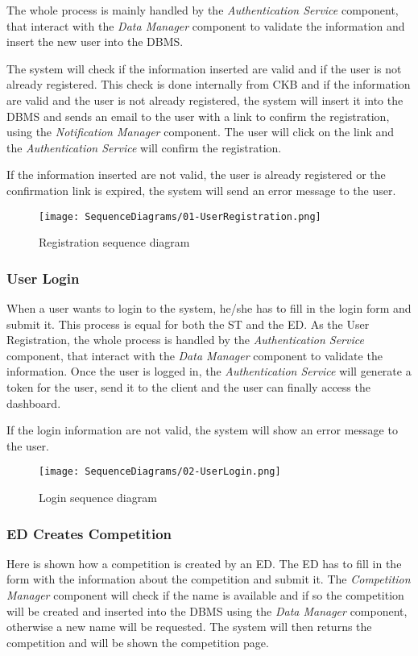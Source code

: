 The whole process is mainly handled by the \textit{Authentication Service} component, that interact with the \textit{Data Manager} component to validate the information and insert the new user into the DBMS.

The system will check if the information inserted are valid and if the user is not already registered. This check is done internally from CKB and if the information are valid and the user is not already registered, the system will insert it into the DBMS and sends an email to the user with a link to confirm the registration, using the \textit{Notification Manager} component. The user will click on the link and the \textit{Authentication Service} will confirm the registration.

If the information inserted are not valid, the user is already registered or the confirmation link is expired, the system will send an error message to the user.

\begin{figure}[H]
  \centering
  \texttt{[image: SequenceDiagrams/01-UserRegistration.png]}
  \caption{Registration sequence diagram}
  \label{fig:registratio_diagramn}
\end{figure}

\subsubsection*{User Login}
\label{ss:login_diagram}%
When a user wants to login to the system, he/she has to fill in the login form and submit it. This process is equal for both the ST and the ED. As the User Registration, the whole process is handled by the \textit{Authentication Service} component, that interact with the \textit{Data Manager} component to validate the information. Once the user is logged in, the \textit{Authentication Service} will generate a token for the user, send it to the client and the user can finally access the dashboard.

If the login information are not valid, the system will show an error message to the user.

\begin{figure}[H]
  \centering
  \texttt{[image: SequenceDiagrams/02-UserLogin.png]}
  \caption{Login sequence diagram}
  \label{fig:login_diagramn}
\end{figure}

\subsubsection*{ED Creates Competition}
\label{ss:create_competition_diagram}
Here is shown how a competition is created by an ED. The ED has to fill in the form with the information about the competition and submit it. The \textit{Competition Manager} component will check if the name is available and if so the competition will be created and inserted into the DBMS using the \textit{Data Manager} component, otherwise a new name will be requested. The system will then returns the competition and will be shown the competition page.

